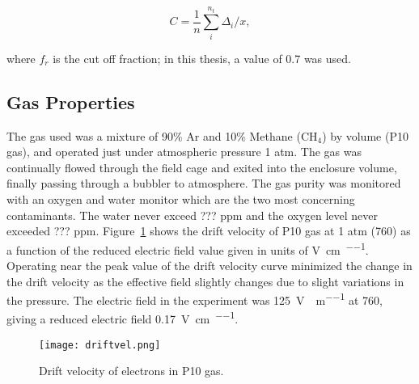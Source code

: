 \begin{equation}
C = \frac{1}{n} \sum\limits_{i}^{n_t} \Delta_i/x,
\end{equation}

where $f_r$ is the cut off fraction; in this thesis, a value of 0.7 was used. 








\subsection{Gas Properties}
The gas used was a mixture of 90\% Ar and 10\% Methane ($\mathrm{CH_4}$) by volume (P10 gas), and operated just under atmospheric pressure 1 atm. The gas was continually flowed through the field cage and exited into the enclosure volume, finally passing through a bubbler to atmosphere. The gas purity was monitored with an oxygen and water monitor which are the two most concerning contaminants. The water never exceed  ??? ppm  and the oxygen level never exceeded ??? ppm. Figure~\ref{fig:driftvel} shows the drift velocity of P10 gas at 1 atm (\SI{760}{\torr}) as a function of the reduced electric field value given in units of \si{\volt\per\centi\metre\per\torr}. Operating near the peak value of the drift velocity curve minimized the change in the drift velocity as the effective field slightly changes due to slight variations in the pressure. The electric field in the experiment was \SI{125}{\volt\per\centi\per\metre} at \SI{760}{\torr}, giving a reduced electric field \SI{0.17}{\volt\per\centi\metre\per\torr}.

\begin{figure}[H]
\texttt{[image: driftvel.png]}
\caption{Drift velocity of electrons in P10 gas.}
\label{fig:driftvel}
\end{figure}

